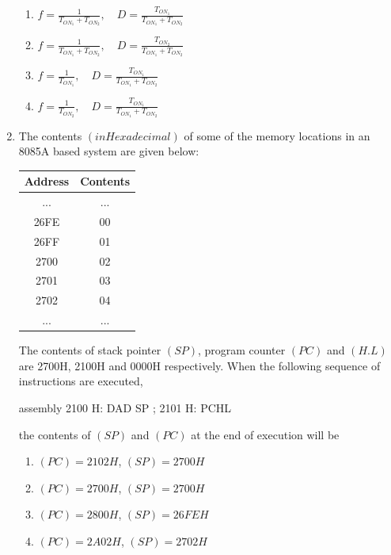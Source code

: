 \documentclass{article}
\newcommand{\brak}[1]{\left( #1 \right)}
\begin{document}
\begin{enumerate}
    \begin{enumerate}
            \item $f = \frac{1}{T_{ON_1} + T_{ON_2}}, \quad D = \frac{T_{ON_1}}{T_{ON_1} + T_{ON_2}}$
            \item $f = \frac{1}{T_{ON_1} + T_{ON_2}}, \quad D = \frac{T_{ON_2}}{T_{ON_1} + T_{ON_2}}$
            \item $f = \frac{1}{T_{ON_1}}, \quad D = \frac{T_{ON_1}}{T_{ON_1} + T_{ON_2}}$
            \item $f = \frac{1}{T_{ON_2}}, \quad D = \frac{T_{ON_1}}{T_{ON_1} + T_{ON_2}}$
        \end{enumerate}

    \item The contents $\brak{in Hexadecimal}$ of some of the memory locations in an 8085A based system are given below:

    \begin{tabular}{|c|c|}
        \hline
        Address & Contents \\
        \hline
        ... & ... \\
        26FE & 00 \\
        26FF & 01 \\
        2700 & 02 \\
        2701 & 03 \\
        2702 & 04 \\
        ... & ... \\
        \hline
    \end{tabular}

    The contents of stack pointer $\brak{SP}$, program counter $\brak{PC}$ and $\brak{H.L}$ are 2700H, 2100H and 0000H respectively. When the following sequence of instructions  
 are executed,

    assembly
    2100 H:  DAD SP ;
    2101 H:  PCHL
    

    the contents of $\brak{SP}$ and $\brak{PC}$ at the end of execution will be
        \begin{enumerate}
            \item $\brak{PC} = 2102H$, $\brak{SP} = 2700H$
            \item $\brak{PC} = 2700H$, $\brak{SP} = 2700H$
            \item $\brak{PC} = 2800H$, $\brak{SP} = 26FEH$
            \item $\brak{PC} = 2A02H$, $\brak{SP} = 2702H$
        \end{enumerate}


\end{enumerate}
\end{document}
